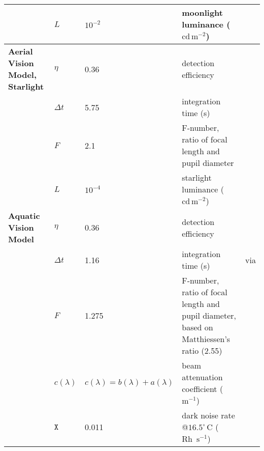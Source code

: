 \begin{tabular}{|L{3.5cm}|L{2cm}|L{4.5cm}|L{4.5cm}|L{2cm}|}
 &$L$&$10^{-2}$&moonlight luminance ($\text{cd}\, \text{m}^{-2}$)&\cite{Midd52a}\\\hline
\textbf{Aerial Vision Model, Starlight}&$\eta$&0.36&detection efficiency&\cite{Nils14a}\\\hline
 &$\Delta t$&5.75&integration time (s)&\cite{Donn95a}\\\hline
 &$F$&2.1&F-number, ratio of focal length and pupil diameter&\cite{Mill79a}\\\hline
 &$L$&$10^{-4}$&starlight luminance ($\text{cd}\, \text{m}^{-2}$)&\cite{Midd52a}\\\hline
\textbf{Aquatic Vision Model}&$\eta$&0.36&detection efficiency&\cite{Nils14a}\\\hline
 &$\Delta t$&1.16&integration time (s)&\cite{Donn95a} via \cite{Nils14a}\\\hline
 &$F$&1.275&F-number, ratio of focal length and pupil diameter, based on Matthiessen's ratio (2.55)&\cite{Nils14a}\\\hline
 &$c(\lambda)$&$c(\lambda)=b(\lambda)+a(\lambda)$&beam attenuation coefficient ($\text{m}^{-1}$)&\cite{Midd52a}\\\hline
 &$\mathtt{X}$&0.011&dark noise rate @$16.5^{\circ} \, \text{C}$ ($\text{Rh } \,\text{s}^{-1}$)&\cite{Aho93a}\\\hline
\end{tabular}
